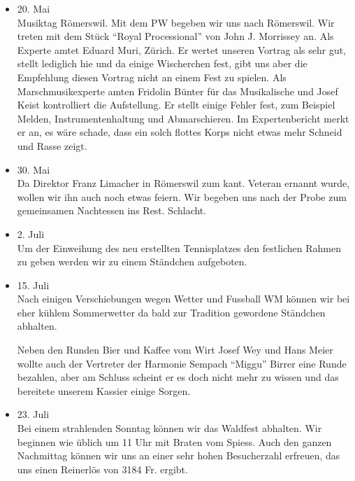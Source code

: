 \begin{multicols}{2}
\begin{itemize}
        \item[]20. Mai\\
        Musiktag Römerswil. Mit dem PW begeben wir uns nach Römerswil. Wir
        treten mit dem Stück "`Royal Processional"' von John J. Morrissey an.
        Als Experte amtet Eduard Muri, Zürich. Er wertet unseren Vortrag als
        sehr gut, stellt lediglich hie und da einige Wischerchen fest, gibt uns
        aber die Empfehlung diesen Vortrag nicht an einem Fest zu spielen. Als
        Marschmusikexperte amten Fridolin Bünter für das Musikalische und Josef
        Keist kontrolliert die Aufstellung. Er stellt einige Fehler fest, zum
        Beispiel Melden, Instrumentenhaltung und Abmarschieren. Im
        Expertenbericht merkt er an, es wäre schade, dass ein solch flottes
        Korps nicht etwas mehr Schneid und Rasse zeigt.

        \item[]30. Mai\\
        Da Direktor Franz Limacher in Römerswil zum kant. Veteran ernannt wurde,
        wollen wir ihn auch noch etwas feiern. Wir begeben uns nach der Probe
        zum gemeinsamen Nachtessen ins Rest. Schlacht.

        \item[]2. Juli\\
        Um der Einweihung des neu erstellten Tennisplatzes den festlichen Rahmen
        zu geben werden wir zu einem Ständchen aufgeboten.

        \item[]15. Juli\\
        Nach einigen Verschiebungen wegen Wetter und Fussball WM können wir bei
        eher kühlem Sommerwetter da bald zur Tradition gewordene Ständchen
        abhalten.

        Neben den Runden Bier und Kaffee vom Wirt Josef Wey und Hans Meier
        wollte auch der Vertreter der Harmonie Sempach "`Miggu"' Birrer eine
        Runde bezahlen, aber am Schluss scheint er es doch nicht mehr zu wissen
        und das bereitete unserem Kassier einige Sorgen.

        \item[]23. Juli\\
        Bei einem strahlenden Sonntag können wir das Waldfest abhalten. Wir
        beginnen wie üblich um 11 Uhr mit Braten vom Spiess. Auch den ganzen
        Nachmittag können wir uns an einer sehr hohen Besucherzahl erfreuen, das
        uns einen Reinerlös von 3184 Fr. ergibt.


\end{itemize}
\end{multicols}
